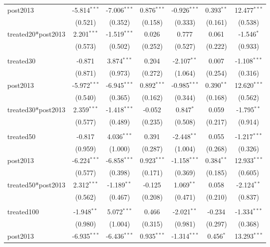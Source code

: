 \documentclass[12pt]{article}
\begin{document}
\begin{table}[!htbp]
\begin{tabular}{@{\extracolsep{5pt}}lcccccc}
 post2013 & -5.814$^{***}$ & -7.006$^{***}$ & 0.876$^{***}$ & -0.926$^{***}$ & 0.393$^{**}$ & 12.477$^{***}$ \\
  & (0.521) & (0.352) & (0.158) & (0.333) & (0.161) & (0.538) \\
 treated20*post2013 & 2.201$^{***}$ & -1.519$^{***}$ & 0.026$^{}$ & 0.777$^{}$ & 0.061$^{}$ & -1.546$^{*}$ \\
  & (0.573) & (0.502) & (0.252) & (0.527) & (0.222) & (0.933) \\
\hline \\[-1.8ex]
 treated30 & -0.871$^{}$ & 3.874$^{***}$ & 0.204$^{}$ & -2.107$^{**}$ & 0.007$^{}$ & -1.108$^{***}$ \\
  & (0.871) & (0.973) & (0.272) & (1.064) & (0.254) & (0.316) \\
 post2013 & -5.972$^{***}$ & -6.945$^{***}$ & 0.892$^{***}$ & -0.985$^{***}$ & 0.390$^{**}$ & 12.620$^{***}$ \\
  & (0.540) & (0.365) & (0.162) & (0.344) & (0.168) & (0.562) \\
 treated30*post2013 & 2.359$^{***}$ & -1.418$^{***}$ & -0.052$^{}$ & 0.847$^{*}$ & 0.059$^{}$ & -1.795$^{**}$ \\
  & (0.577) & (0.489) & (0.235) & (0.508) & (0.217) & (0.914) \\
\hline \\[-1.8ex]
 treated50 & -0.817$^{}$ & 4.036$^{***}$ & 0.391$^{}$ & -2.448$^{**}$ & 0.055$^{}$ & -1.217$^{***}$ \\
  & (0.959) & (1.000) & (0.287) & (1.004) & (0.268) & (0.326) \\
 post2013 & -6.224$^{***}$ & -6.858$^{***}$ & 0.923$^{***}$ & -1.158$^{***}$ & 0.384$^{**}$ & 12.933$^{***}$ \\
  & (0.577) & (0.398) & (0.171) & (0.369) & (0.185) & (0.605) \\
 treated50*post2013 & 2.312$^{***}$ & -1.189$^{**}$ & -0.125$^{}$ & 1.069$^{**}$ & 0.058$^{}$ & -2.124$^{**}$ \\
  & (0.562) & (0.467) & (0.208) & (0.471) & (0.210) & (0.837) \\
\hline \\[-1.8ex]
 treated100 & -1.948$^{**}$ & 5.072$^{***}$ & 0.466$^{}$ & -2.021$^{**}$ & -0.234$^{}$ & -1.334$^{***}$ \\
  & (0.980) & (1.004) & (0.315) & (0.981) & (0.297) & (0.368) \\
 post2013 & -6.935$^{***}$ & -6.436$^{***}$ & 0.935$^{***}$ & -1.314$^{***}$ & 0.456$^{*}$ & 13.293$^{***}$ \\

\end{tabular}
\end{table}
\end{document}
